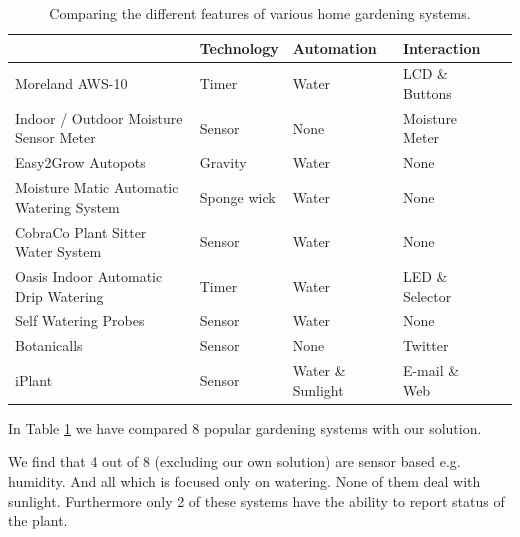 \documentclass{ubicomp2012}
\begin{document}
\begin{table}[comparison_table]
\begin{center}
\renewcommand{\arraystretch}{1.5}
\begin{tabular}{| p{7cm} | p{3cm} |p{3cm}  | p{3cm} | p{3cm} |}
\hline
                                                    & Technology                        & Automation        & Interaction \\ \hline
        Moreland AWS-10 \cite{moreland}             & Timer                             & Water             & LCD \& Buttons \\ \hline
        Indoor / Outdoor Moisture Sensor Meter \cite{moisture-meter} & Sensor           & None              & Moisture Meter \\ \hline
        Easy2Grow Autopots \cite{autopots}          & Gravity                           & Water             & None \\ \hline
        Moisture Matic Automatic Watering System \cite{moisture-matic} & Sponge wick    & Water             & None \\ \hline
        CobraCo Plant Sitter Water System \cite{plant-sitter}   & Sensor                & Water             & None \\ \hline
        Oasis Indoor Automatic Drip Watering \cite{oasis-auto-drip} & Timer             & Water             & LED \& Selector \\ \hline
        Self Watering Probes \cite{self-watering-probes} & Sensor                       & Water             & None \\ \hline
        Botanicalls \cite{botanicalls}              & Sensor                            & None              & Twitter  \\ \hline
        iPlant                                      & Sensor                            & Water \& Sunlight & E-mail \& Web \\ \hline
\end{tabular}
\caption{Comparing the different features of various home gardening systems.}
\label{tab:Comparison-Table}
\end{center}
\end{table}

In Table \ref{tab:Comparison-Table} we have compared 8 popular gardening systems with our solution.

We find that 4 out of 8 (excluding our own solution) are sensor based e.g. humidity. And all which is focused only on watering. None of them deal with sunlight. 
Furthermore only 2 of these systems have the ability to report status of the plant.
\end{document}
